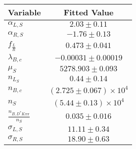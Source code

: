 \begin{tabular}[t]{lc}
\hline
Variable &Fitted Value\\
\hline\hline
$\alpha_{L, S}$&$2.03\pm0.11$\\
\hline
$\alpha_{R, S}$&$-1.76\pm0.13$\\
\hline
$f_{\frac{L}{R}}$&$0.473\pm0.041$\\
\hline
$\lambda_{B,c}$&$-0.00031\pm0.00019$\\
\hline
$\mu_S$&$5278.903\pm0.093$\\
\hline
$n_{L_S}$&$0.44\pm0.14$\\
\hline
$n_{B,c}$&$(2.725\pm0.067)\times 10^4$\\
\hline
$n_S$&$(5.44\pm0.13)\times 10^4$\\
\hline
$\frac{n_{B,D^*K\pi\pi}}{n_S}$&$0.035\pm0.016$\\
\hline
$\sigma_{L, S}$&$11.11\pm0.34$\\
\hline
$\sigma_{R, S}$&$18.90\pm0.63$\\
\hline
\end{tabular}